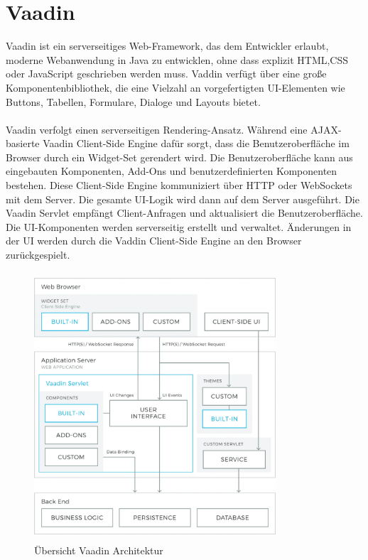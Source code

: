 \documentclass[a4paper,12pt]{scrreprt}
\begin{document}
\section{Vaadin}
Vaadin ist ein serverseitiges Web-Framework, das dem Entwickler erlaubt, moderne Webanwendung in Java zu entwicklen, ohne dass explizit HTML,CSS oder JavaScript geschrieben werden muss. Vaddin verfügt über eine große Komponentenbibliothek, die eine Vielzahl an vorgefertigten UI-Elementen wie Buttons, Tabellen, Formulare, Dialoge und Layouts bietet. \\ \\
Vaadin verfolgt einen serverseitigen Rendering-Ansatz. Während eine AJAX-basierte Vaadin Client-Side Engine dafür sorgt, dass die Benutzeroberfläche im Browser durch ein Widget-Set gerendert wird. Die Benutzeroberfläche kann aus eingebauten Komponenten, Add-Ons und benutzerdefinierten Komponenten bestehen. Diese Client-Side Engine kommuniziert über HTTP oder WebSockets mit dem Server. Die gesamte UI-Logik wird dann auf dem Server ausgeführt. Die Vaadin Servlet empfängt Client-Anfragen und aktualisiert die Benutzeroberfläche. Die UI-Komponenten werden serverseitig erstellt und verwaltet. Änderungen in der UI werden durch die Vaddin Client-Side Engine an den Browser zurückgespielt.  
\begin{figure}[h!]
\centering
\includegraphics[width=9cm, height=10cm]{vaadin_architekture.jpg}
\caption{\label{vaadin:architektur}Übersicht Vaadin Architektur \cite{architecture21}}
\end{figure}
\end{document}
